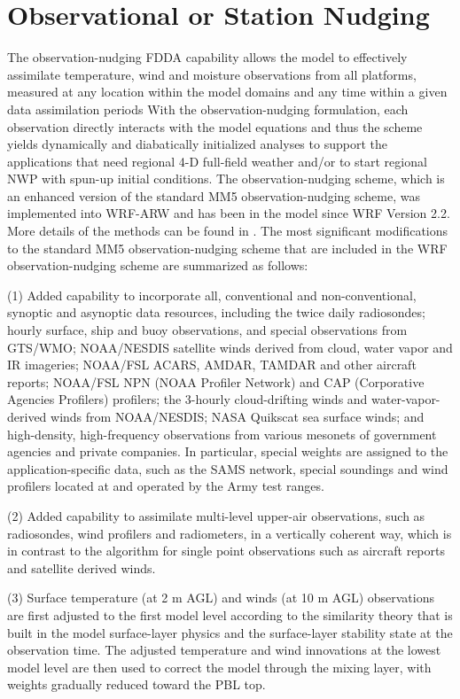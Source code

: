 \section{Observational or Station Nudging}

The observation-nudging FDDA capability allows the model to effectively assimilate temperature, wind and moisture observations from all platforms, measured at any location within the model domains and any time within a given data assimilation periods With the observation-nudging formulation, each observation directly interacts with the model equations and thus the scheme yields dynamically and diabatically initialized analyses to support the applications that need regional 4-D full-field weather and/or to start regional NWP with spun-up initial conditions. The observation-nudging scheme, which is an enhanced version of the standard MM5 observation-nudging scheme, was implemented into WRF-ARW and has been in the model since WRF Version 2.2. 
More details of the methods can be found in \citet{liu08}.
The most significant modifications to the standard MM5 observation-nudging scheme \citep{stauffer94} that are included in the WRF observation-nudging scheme are summarized as follows:

(1) Added capability to incorporate all, conventional and  non-conventional, synoptic and asynoptic data resources, including the twice daily radiosondes; hourly surface, ship and buoy observations, and special observations from GTS/WMO; NOAA/NESDIS satellite winds derived from cloud, water vapor and IR imageries; NOAA/FSL ACARS, AMDAR, TAMDAR and other aircraft reports; NOAA/FSL NPN (NOAA Profiler Network) and CAP (Corporative Agencies Profilers) profilers; the 3-hourly cloud-drifting winds and water-vapor-derived winds from NOAA/NESDIS; NASA Quikscat sea surface winds; and high-density, high-frequency observations from various mesonets of government agencies and private companies. In particular, special weights are assigned to the application-specific data, such as the SAMS network, special soundings and wind profilers located at and operated by the Army test ranges. 

(2) Added capability to assimilate multi-level upper-air observations, such as radiosondes, wind profilers and radiometers, in a vertically coherent way, which is in contrast to the algorithm for single point observations such as aircraft reports and satellite derived winds. 

(3) Surface temperature (at 2 m AGL) and winds (at 10 m AGL) observations are first adjusted to the first model level according to the similarity theory that is built in the model surface-layer physics and the surface-layer stability state at the observation time. The adjusted temperature and wind innovations at the lowest model level are then used to correct the model through the mixing layer, with weights gradually reduced toward the PBL top. 

